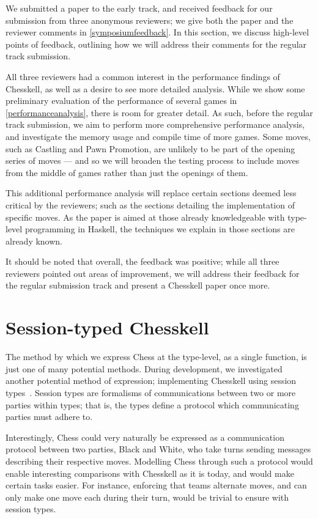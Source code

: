 We submitted a paper to the early track, and received feedback for our submission from three anonymous reviewers; we give both the paper and the reviewer comments in \cref{symposiumfeedback}. In this section, we discuss high-level points of feedback, outlining how we will address their comments for the regular track submission.

All three reviewers had a common interest in the performance findings of Chesskell, as well as a desire to see more detailed analysis. While we show some preliminary evaluation of the performance of several games in \cref{performanceanalysis}, there is room for greater detail. As such, before the regular track submission, we aim to perform more comprehensive performance analysis, and investigate the memory usage and compile time of more games. Some moves, such as Castling and Pawn Promotion, are unlikely to be part of the opening series of moves --- and so we will broaden the testing process to include moves from the middle of games rather than just the openings of them.

This additional performance analysis will replace certain sections deemed less critical by the reviewers; such as the sections detailing the implementation of specific moves. As the paper is aimed at those already knowledgeable with type-level programming in Haskell, the techniques we explain in those sections are already known.

It should be noted that overall, the feedback was positive; while all three reviewers pointed out areas of improvement, we will address their feedback for the regular submission track and present a Chesskell paper once more.

\section{Session-typed Chesskell}

The method by which we express Chess at the type-level, as a single function, is just one of many potential methods. During development, we investigated another potential method of expression; implementing Chesskell using session types~\cite{torinosessions}. Session types are formalisms of communications between two or more parties within types; that is, the types define a protocol which communicating parties must adhere to.

Interestingly, Chess could very naturally be expressed as a communication protocol between two parties, Black and White, who take turns sending messages describing their respective moves. Modelling Chess through such a protocol would enable interesting comparisons with Chesskell as it is today, and would make certain tasks easier. For instance, enforcing that teams alternate moves, and can only make one move each during their turn, would be trivial to ensure with session types.

